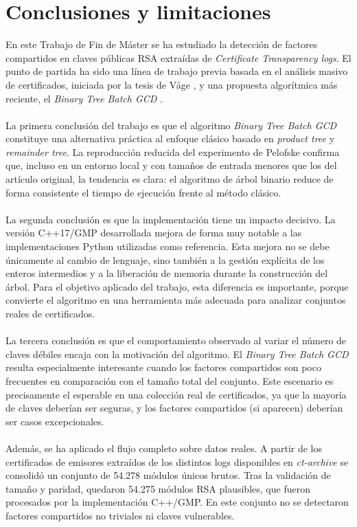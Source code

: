 \chapter{Conclusiones y limitaciones}

En este Trabajo de Fin de Máster se ha estudiado la detección de factores compartidos en claves públicas RSA extraídas de \textit{Certificate Transparency logs}. El punto de partida ha sido una línea de trabajo previa basada en el análisis masivo de certificados, iniciada por la tesis de Våge \citep{vage2022finding}, y una propuesta algorítmica más reciente, el \textit{Binary Tree Batch GCD} \citep{pelofske2024efficient}.
\\
\\
La primera conclusión del trabajo es que el algoritmo \textit{Binary Tree Batch GCD} constituye una alternativa práctica al enfoque clásico basado en \textit{product tree} y \textit{remainder tree}. La reproducción reducida del experimento de Pelofske confirma que, incluso en un entorno local y con tamaños de entrada menores que los del artículo original, la tendencia es clara: el algoritmo de árbol binario reduce de forma consistente el tiempo de ejecución frente al método clásico.
\\
\\
La segunda conclusión es que la implementación tiene un impacto decisivo. La versión C++17/GMP desarrollada mejora de forma muy notable a las implementaciones Python utilizadas como referencia. Esta mejora no se debe únicamente al cambio de lenguaje, sino también a la gestión explícita de los enteros intermedios y a la liberación de memoria durante la construcción del árbol. Para el objetivo aplicado del trabajo, esta diferencia es importante, porque convierte el algoritmo en una herramienta más adecuada para analizar conjuntos reales de certificados.
\\
\\
La tercera conclusión es que el comportamiento observado al variar el número de claves débiles encaja con la motivación del algoritmo. El \textit{Binary Tree Batch GCD} resulta especialmente interesante cuando los factores compartidos son poco frecuentes en comparación con el tamaño total del conjunto. Este escenario es precisamente el esperable en una colección real de certificados, ya que la mayoría de claves deberían ser seguras, y los factores compartidos (si aparecen) deberían ser casos excepcionales.
\\
\\
Además, se ha aplicado el flujo completo sobre datos reales. A partir de los certificados de emisores extraídos de los distintos logs disponibles en \textit{ct-archive} se consolidó un conjunto de 54.278 módulos únicos brutos. Tras la validación de tamaño y paridad, quedaron 54.275 módulos RSA plausibles, que fueron procesados por la implementación C++/GMP. En este conjunto no se detectaron factores compartidos no triviales ni claves vulnerables.
